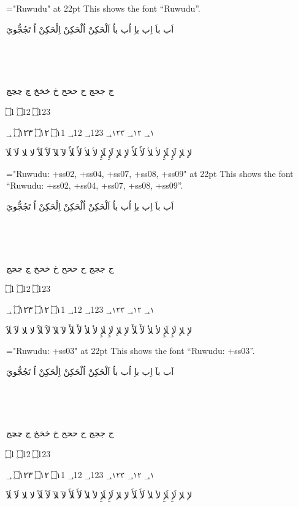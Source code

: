 

\vsize=9.5in
\nopagenumbers
\parindent=0pt
\def\testFont#1{
  \font\x="#1" at 22pt \x
    This shows the font “#1”. \par\touching\par\imala\par\wagaf\par\jeem\par\endayahA\par\endayahB \number\par \lamalef \par}

\baselineskip=20pt

\def\touching{\beginR اَب باَ  اِب باِ اُب باُ  اَلْحَكِنْ اُلْحَكِنْ اِلْحَكِنْ  اُ تَجُجُّويَ  \endR} %
\def\number{\beginR ؀1 ؀12 ؀123 ؀١ ؀١٢ ؀١٢٣ \endR} 
\def\endayahA{\beginR ۝1   ۝12   ۝123   \endR} %
\def\endayahB{\beginR ۝١   ۝١٢   ۝١٢٣ \endR} %
\def\imala{\beginR بٜ  \endR} %
\def\wagaf{\beginR ؿ ؿؿؿ ڟ ڟڟڟ ݑ ݑݑݑ ݣ ݣݣݣ ࣃ ࣃࣃࣃ ࣄ ࣄࣄࣄ \endR} %
\def\jeem{\beginR ج ججج ح ححح خ خخخ ڃ ڃڃڃ   \endR} %
\def\lamalef{\beginR لإ ‍لإ لَإِ ‍لَإِ لأ ‍لأ لَأَ ‍لَأَ لإ ‍لإ لَإِ ‍لَإِ لأ ‍لأ لَأَ ‍لَأَ لآ ‍لآ لَآَ ‍لَآَ لا ‍لا لَاَ ‍لَاَ \endR} 
\bigskip


\testFont{Ruwudu}

\bigskip

\testFont{Ruwudu:
       +ss02, +ss04, +ss07, +ss08, +ss09}

\bigskip

\testFont{Ruwudu:
       +ss03}

\bigskip


\bigskip

\bye

